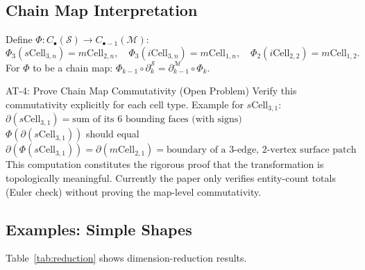 \documentclass[journal,twocolumn,10pt]{IEEEtran}
\newcommand{\bdry}{\partial}
\newcommand{\Ck}[1]{C_{#1}}
\newcommand{\sCell}[2]{s\text{Cell}_{#1,#2}}
\newcommand{\iCell}[2]{i\text{Cell}_{#1,#2}}
\newcommand{\mCell}[2]{m\text{Cell}_{#1,#2}}
\begin{document}
\subsection{Chain Map Interpretation}\label{sec:chain_map}

Define $\Phi:\Ck{\bullet}(\mathcal{S})\to\Ck{\bullet-1}(\mathcal{M})$:
\[
  \Phi_3(\sCell{3}{n})=\mCell{2}{n},\quad
  \Phi_3(\iCell{3}{n})=\mCell{1}{n},\quad
  \Phi_2(\iCell{2}{2})=\mCell{1}{2}.
\]
For $\Phi$ to be a chain map:
$\Phi_{k-1}\circ\bdry_k^{\mathcal{S}}=\bdry_{k-1}^{\mathcal{M}}\circ\Phi_k$.

\begin{atblock}{AT-4: Prove Chain Map Commutativity (Open Problem)}
Verify this commutativity explicitly for each cell type. Example for
$\sCell{3}{1}$:\\
$\bdry(\sCell{3}{1})=\text{sum of its 6 bounding faces (with signs)}$\\
$\Phi(\bdry(\sCell{3}{1}))$ should equal $\bdry(\Phi(\sCell{3}{1}))
=\bdry(\mCell{2}{1})=\text{boundary of a 3-edge, 2-vertex surface patch}$\\
This computation constitutes the rigorous proof that the transformation is
topologically meaningful. Currently the paper only verifies entity-count
totals (Euler check) without proving the map-level commutativity.
\end{atblock}

\subsection{Examples: Simple Shapes}

Table~\ref{tab:reduction} shows dimension-reduction results.
\end{document}
